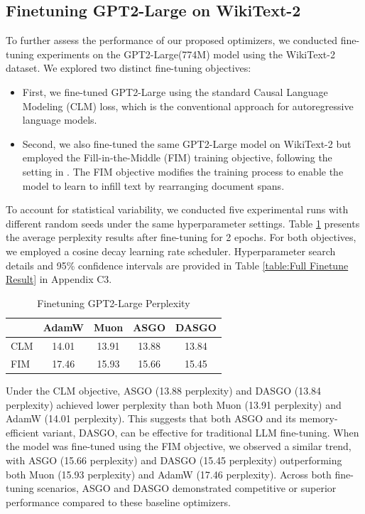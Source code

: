 \documentclass{article}
\theoremstyle{remark}
\begin{document}
\subsection{Finetuning GPT2-Large on WikiText-2}
To further assess the performance of our proposed optimizers, we conducted fine-tuning experiments on the GPT2-Large(774M) model \citep{radford2019language} using the WikiText-2 dataset. We explored two distinct fine-tuning objectives:
\begin{itemize}[leftmargin=*]
    \item First, we fine-tuned GPT2-Large using the standard Causal Language Modeling (CLM) loss, which is the conventional approach for autoregressive language models.
    \item Second, we also fine-tuned the same GPT2-Large model on WikiText-2 but employed the Fill-in-the-Middle (FIM) training objective, following the setting in \citep{bavarian2022efficienttraininglanguagemodels}. The FIM objective modifies the training process to enable the model to learn to infill text by rearranging document spans.
\end{itemize}

To account for statistical variability, we conducted five experimental runs with different random seeds under the same hyperparameter settings. Table \ref{table:Finetune Result} presents the average perplexity results after fine-tuning for 2 epochs. For both objectives, we employed a cosine decay learning rate scheduler. Hyperparameter search details and 95\% confidence intervals are provided in Table \ref{table:Full Finetune Result} in Appendix C3.
\begin{table}
    \centering
    \vspace{-0.4cm}
    \caption{Finetuning GPT2-Large Perplexity}
    \begin{tabular}{l|cccc}
        \toprule
        & AdamW & Muon & ASGO & DASGO \\
        \midrule
        CLM  & 14.01 & 13.91 & 13.88 & 13.84 \\
        FIM  & 17.46 & 15.93 & 15.66 & 15.45 \\
        \bottomrule
    \end{tabular}
    \vspace{-0.4cm}
    \label{table:Finetune Result}
\end{table}
Under the CLM objective, ASGO (13.88 perplexity) and DASGO (13.84 perplexity) achieved lower perplexity than both Muon (13.91 perplexity) and AdamW (14.01 perplexity). This suggests that both ASGO and its memory-efficient variant, DASGO, can be effective for traditional LLM fine-tuning. When the model was fine-tuned using the FIM objective, we observed a similar trend, with ASGO (15.66 perplexity) and DASGO (15.45 perplexity) outperforming both Muon (15.93 perplexity) and AdamW (17.46 perplexity). Across both fine-tuning scenarios, ASGO and DASGO demonstrated competitive or superior performance compared to these baseline optimizers.
\end{document}
